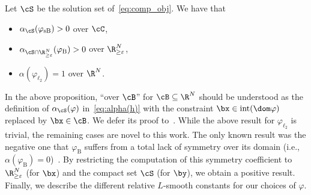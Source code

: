 \documentclass[11pt]{amsart}
\begin{document}
\begin{proposition}\label{prop:restr_alpha_KL}
Let $\cS$ be the solution set of~\cref{eq:comp_obj}. We have that 
\begin{itemize}
\item $\alpha_{\cS}(\varphi_{\mathrm{sB}})>0$ over $\cC$,
\item $\alpha_{\cS \cap \R_{\geq \varepsilon}^N}(\varphi_\mathrm{B})>0$ over $\R_{\geq \varepsilon}^N$,
\item $\alpha(\varphi_{\ell_2})=1$ over $\R^N$.
\end{itemize}
\end{proposition}
In the above proposition, ``over $\cB$'' for $\cB \subseteq \R^N$ should be understood as the definition of $\alpha_\cS(\varphi)$  in~\cref{eq:alpha(h)} with the constraint $\bx \in \mathrm{int}(\dom \varphi)$ replaced by $\bx \in \cB$. We defer its proof to~. While the above result for $\varphi_{\ell_2}$ is trivial, the remaining cases are novel to this work. The only known result was the negative one that $\varphi_\mathrm{B}$ suffers from a total lack of symmetry over its domain (i.e., $\alpha(\varphi_\mathrm{B}) = 0$)~\cite{bauschke2017descent}. By restricting the computation of this symmetry coefficient to $\R_{\geq \varepsilon}^N$ (for $\bx$) and the compact set $\cS$ (for $\by$), we obtain a positive result. Finally, we describe the different relative $L$-smooth constants for our choices of $\varphi$.
\end{document}
